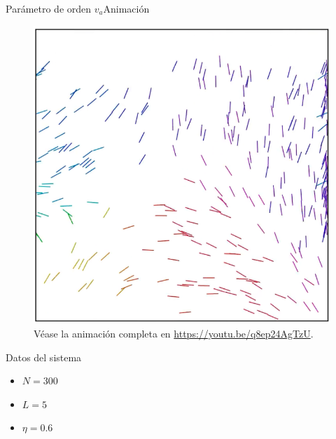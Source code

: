\documentclass{beamer}
\begin{document}
            \begin{frame}{Parámetro de orden $v_a$}{Animación}
                \begin{minipage}[t]{0.60\textwidth}
                    \begin{figure}[H!]
                        \includegraphics[height=.65\textheight]{./animation-n300-eta0p6-frame}
                        \caption*{Véase la animación completa en \url{https://youtu.be/q8ep24AgTzU}.}
                        \label{fig:va_1}
                    \end{figure}
                \end{minipage}
                \hfill
                \begin{minipage}[t]{0.30\textwidth}
                    \begin{block}{Datos del sistema}
                        \begin{itemize}
                            \item $N=300$
                            \item $L=5$
                            \item $\eta=0.6$
                        \end{itemize}
                    \end{block}
                \end{minipage}
            \end{frame}
\end{document}
